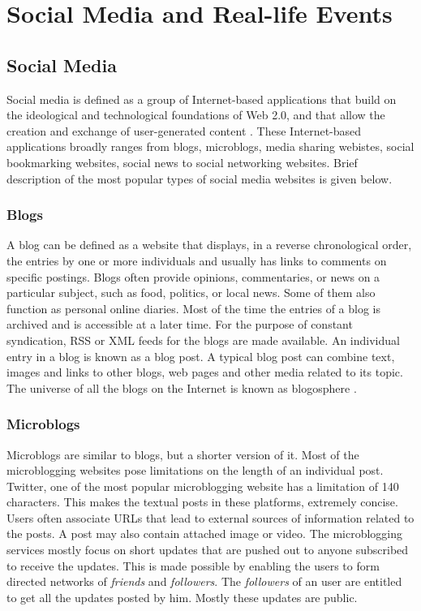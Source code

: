 
\chapter{Social Media and Real-life Events} %

\label{events} %

\doublespacing
\setlength{\parindent}{1cm}
\section{Social Media}
Social media is defined as a group of Internet-based applications that build on the ideological and technological foundations of Web 2.0, and that allow the creation and exchange of user-generated content \cite{kaplan2010users}. These Internet-based applications broadly ranges from blogs, microblogs, media sharing webistes, social bookmarking websites, social news to social networking websites. Brief description of the most popular types of social media websites is given below.

\subsection{Blogs}
A blog can be defined as a website that displays, in a reverse chronological order, the entries by one or more individuals and usually has links to comments on specific postings. Blogs often provide opinions, commentaries, or news on a particular subject, such as food, politics, or local news. Some of them also function as personal online diaries. Most of the time the entries of a blog is archived and is accessible at a later time. For the purpose of constant syndication, RSS or XML feeds for the blogs are made available. An individual entry in a blog is known as a blog post. A typical blog post can combine text, images and links to other blogs, web pages and other media related to its topic. The universe of all the blogs on the Internet is known as blogosphere \cite{agarwal2014time}.

\subsection{Microblogs}
Microblogs are similar to blogs, but a shorter version of it. Most of the microblogging websites pose limitations on the length of an individual post. Twitter, one of the most popular microblogging website has a limitation of 140 characters. This makes the textual posts in these platforms, extremely concise. Users often associate URLs that lead to external sources of information related to the posts. A post may also contain attached image or video. The microblogging services mostly focus on short updates that are pushed out to anyone subscribed to receive the updates. This is made possible by enabling the users to form directed networks of \textit{friends} and \textit{followers}. The \textit{followers} of an user are entitled to get all the updates posted by him. Mostly these updates are public. 

